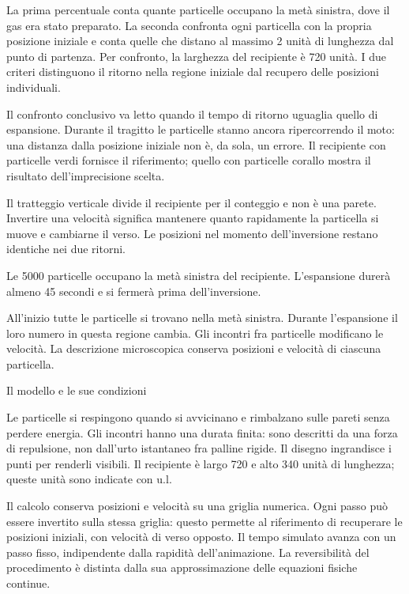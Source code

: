 La prima percentuale conta quante particelle occupano la metà sinistra, dove il gas era stato preparato. La seconda confronta ogni particella con la propria posizione iniziale e conta quelle che distano al massimo 2 unità di lunghezza dal punto di partenza. Per confronto, la larghezza del recipiente è 720 unità. I due criteri distinguono il ritorno nella regione iniziale dal recupero delle posizioni individuali.\par

Il confronto conclusivo va letto quando il tempo di ritorno uguaglia quello di espansione. Durante il tragitto le particelle stanno ancora ripercorrendo il moto: una distanza dalla posizione iniziale non è, da sola, un errore. Il recipiente con particelle verdi fornisce il riferimento; quello con particelle corallo mostra il risultato dell'imprecisione scelta.\par

Il tratteggio verticale divide il recipiente per il conteggio e non è una parete. Invertire una velocità significa mantenere quanto rapidamente la particella si muove e cambiarne il verso. Le posizioni nel momento dell'inversione restano identiche nei due ritorni.\par


Le 5000 particelle occupano la metà sinistra del recipiente. L'espansione durerà almeno 45 secondi e si fermerà prima dell'inversione.\par


All'inizio tutte le particelle si trovano nella metà sinistra. Durante l'espansione il loro numero in questa regione cambia. Gli incontri fra particelle modificano le velocità. La descrizione microscopica conserva posizioni e velocità di ciascuna particella.\par


Il modello e le sue condizioni\par

Le particelle si respingono quando si avvicinano e rimbalzano sulle pareti senza perdere energia. Gli incontri hanno una durata finita: sono descritti da una forza di repulsione, non dall'urto istantaneo fra palline rigide. Il disegno ingrandisce i punti per renderli visibili. Il recipiente è largo 720 e alto 340 unità di lunghezza; queste unità sono indicate con u.l.\par

Il calcolo conserva posizioni e velocità su una griglia numerica. Ogni passo può essere invertito sulla stessa griglia: questo permette al riferimento di recuperare le posizioni iniziali, con velocità di verso opposto. Il tempo simulato avanza con un passo fisso, indipendente dalla rapidità dell'animazione. La reversibilità del procedimento è distinta dalla sua approssimazione delle equazioni fisiche continue.\par

